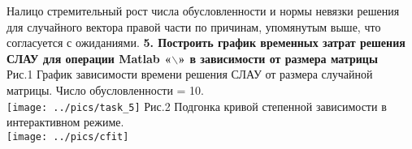 \documentclass[a4paper]{article}
\begin{document}
Налицо стремительный рост числа обусловленности и нормы невязки решения для случайного вектора правой части по причинам, упомянутым выше, что согласуется с ожиданиями.
\newpage
{\Large{\textbf{5. Построить график временных затрат решения СЛАУ для операции Matlab «$\backslash$» в зависимости от размера матрицы}}}\\
Рис.1 График зависимости времени решения СЛАУ от размера случайной матрицы. Число обусловленности = 10.\\
\texttt{[image: ../pics/task\_5]}
Рис.2 Подгонка кривой степенной зависимости в интерактивном режиме.\\
\texttt{[image: ../pics/cfit]}
\end{document}
